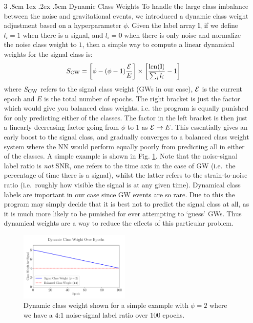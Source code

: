 \documentclass[%
reprint,
amsmath,amssymb,
aps,
]{revtex4-2}
\makeatletter
\renewcommand{\subsubsection}{%
	\@startsection
	{subsubsection}%
	{3}%
	{\z@}%
	{.8cm \@plus1ex \@minus .2ex}%
	{.5cm}%
	{\normalfont\small\centering}%
}
\makeatother
\begin{document}
\subsubsection{Dynamic Class Weights}
To handle the large class imbalance between the noise and gravitational events, we introduced a dynamic class weight adjustment based on a hyperparameter $\phi$. Given the label array $\textbf{l}$, if we define $l_i=1$ when there is a signal, and $l_i=0$ when there is only noise and normalize the noise class weight to $1$, then a simple way to compute a linear dynamical weights for the signal class is:
\begin{align}	\label{eq:dynamical_signal_weights}
	S_{\rm CW}&=\left[\phi-(\phi-1)\frac{\varE}{E}\right]\times\left[\frac{{\rm len}(\textbf{l})}{\sum_i l_i}-1\right]
\end{align}
where $S_{\rm CW}$ refers to the signal class weight (GWs in our case), $\varE$ is the current epoch and $E$ is the total number of epochs. The right bracket is just the factor which would give you balanced class weights, i.e. the program is equally punished for only predicting either of the classes. The factor in the left bracket is then just a linearly decreasing factor going from $\phi$ to $1$ as $\varE\to E$. This essentially gives an early boost to the signal class, and gradually converges to a balanced class weight system where the NN would perform equally poorly from predicting all in either of the classes. A simple example is shown in Fig. \ref{fig:DynamicCW}. Note that the noise-signal label ratio is \textit{not} SNR, one refers to the time axis in the case of GW (i.e.~the percentage of time there is a signal), whilst the latter refers to the strain-to-noise ratio (i.e.~roughly how visible the signal is at any given time). Dynamical class labels are important in our case since GW events are so rare. Due to this the program may simply decide that it is best not to predict the signal class at all, as it is much more likely to be punished for ever attempting to `guess' GWs. Thus dynamical weights are a way to reduce the effects of this particular problem.
\begin{figure}[ht!]
	\includegraphics[width=0.49\textwidth]{Figures/DynamicCW.pdf}
	\caption{Dynamic class weight shown for a simple example with $\phi=2$ where we have a 4:1 noise-signal label ratio over 100 epochs.}
	\label{fig:DynamicCW}
\end{figure}
\end{document}
